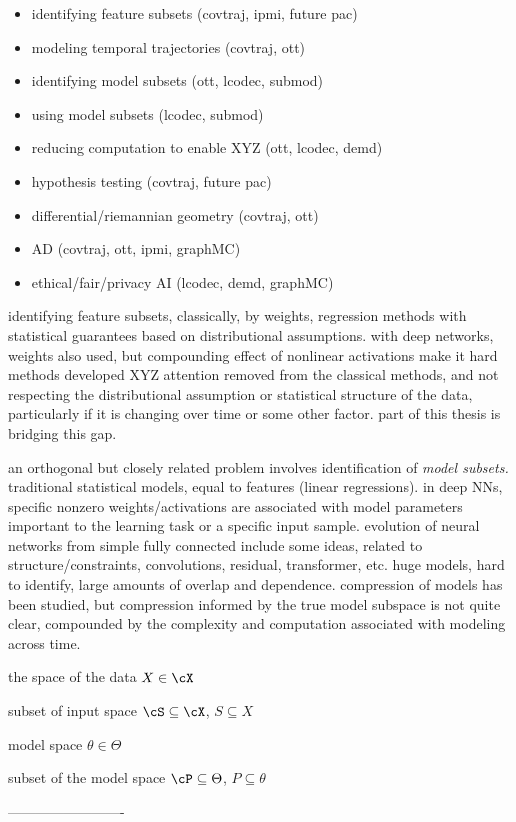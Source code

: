 
\begin{itemize}
    \item identifying feature subsets (covtraj, ipmi, future pac)
    \item modeling temporal trajectories (covtraj, ott)
    \item identifying model subsets (ott, lcodec, submod)
    \item using model subsets (lcodec, submod)
    \item reducing computation to enable XYZ (ott, lcodec, demd)
    \item hypothesis testing (covtraj, future pac)
    \item differential/riemannian geometry (covtraj, ott)
    \item AD (covtraj, ott, ipmi, graphMC) 
    \item ethical/fair/privacy AI (lcodec, demd, graphMC)
\end{itemize}

identifying feature subsets, classically, by weights, regression methods with statistical guarantees based on distributional assumptions.
with deep networks, weights also used, but compounding effect of nonlinear activations make it hard
methods developed XYZ
attention
removed from the classical methods, and not respecting the distributional assumption or statistical structure of the data, particularly if it is changing over time or some other factor.
part of this thesis is bridging this gap.

an orthogonal but closely related problem involves identification of \textit{model subsets.}
traditional statistical models, equal to features (linear regressions). 
in deep NNs, specific nonzero weights/activations are associated with model parameters important to the learning task or a specific input sample.
evolution of neural networks from simple fully connected include some ideas,
related to structure/constraints, convolutions, residual, transformer, etc.
huge models, hard to identify, large amounts of overlap and dependence.
compression of models has been studied, but compression informed by the true model subspace is not quite clear,
compounded by the complexity and computation associated with modeling across time.


the space of the data $X \in \cX$

subset of input space $\cS \subseteq \cX$, $S \subseteq X$

model space $\theta \in \Theta$

subset of the model space $\cP \subseteq \Theta$, $P \subseteq \theta$

-------------------------
